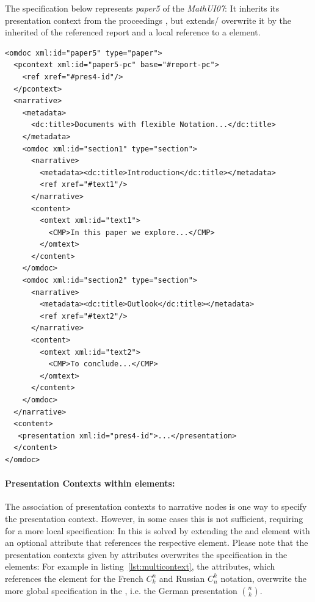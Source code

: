 \documentclass[a4paper]{article}
\begin{document}
The {\omdoc} specification below represents {\emph{paper5}} of the {\emph{MathUI07}}: It
inherits its presentation context from the proceedings {}, but extends/
overwrite it by the inherited {} of the referenced report and a local
reference to a {} element.

\begin{lstlisting}[mathescape,numbers=none]
<omdoc xml:id="paper5" type="paper">
  <pcontext xml:id="paper5-pc" base="#report-pc">
    <ref xref="#pres4-id"/>
  </pcontext>
  <narrative>
    <metadata>
      <dc:title>Documents with flexible Notation...</dc:title>
    </metadata>
    <omdoc xml:id="section1" type="section">
      <narrative>
        <metadata><dc:title>Introduction</dc:title></metadata> 
        <ref xref="#text1"/>
      </narrative>
      <content>
        <omtext xml:id="text1">
          <CMP>In this paper we explore...</CMP>
        </omtext>
      </content>
    </omdoc>
    <omdoc xml:id="section2" type="section">
      <narrative>
        <metadata><dc:title>Outlook</dc:title></metadata>
        <ref xref="#text2"/>
      </narrative>
      <content>
        <omtext xml:id="text2">
          <CMP>To conclude...</CMP>
        </omtext>
      </content>
    </omdoc> 
  </narrative>
  <content>
   <presentation xml:id="pres4-id">...</presentation>
  </content>
</omdoc>
\end{lstlisting}


\paragraph{Presentation Contexts within {\omdoc} elements:}
The association of presentation contexts to narrative nodes is one way to specify the
presentation context. However, in some cases this is not sufficient, requiring for a more
local specification: In {\omdoc} this is solved by extending the {} and
{} element with an optional attribute {} that references the
respective {} element. Please note that the presentation contexts
given by {} attributes overwrites the specification in the
{} elements: For example in listing~\ref{lst:multicontext}, the
{} attributes, which references the {} element for
the French $C_{k}^n$ and Russian $C_{n}^k$ notation, overwrite the more global
specification in the {}, i.e. the German presentation ${n \choose k}$.
\end{document}
